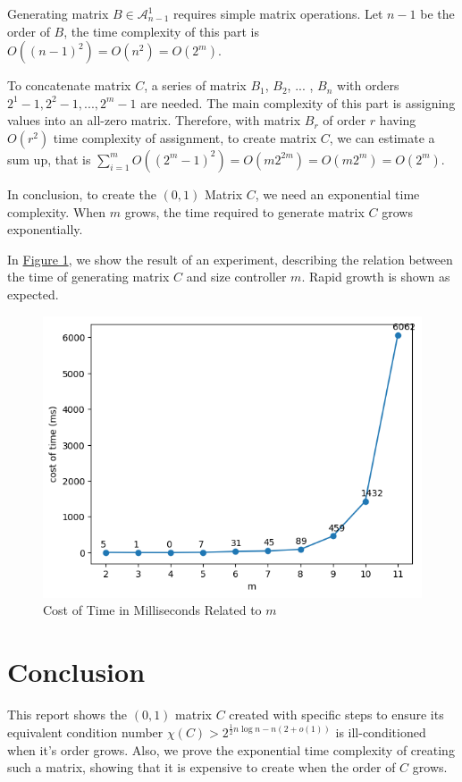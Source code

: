 \documentclass[11pt]{article}
\begin{document}
Generating matrix $B\in \mathcal{A}_{n - 1}^1$ requires simple matrix operations. Let $n - 1$ be the order of $B$, the time complexity of this part is $O((n-1)^2) = O(n^2) = O(2^m)$.

To concatenate matrix $C$, a series of matrix $B_1$, $B_2$, ... , $B_n$ with orders $2^1-1, 2^2-1, ..., 2^m-1$ are needed. The main complexity of this part is assigning values into an all-zero matrix. Therefore, with matrix $B_r$ of order $r$ having $O(r^2)$ time complexity of assignment, to create matrix $C$, we can estimate a sum up, that is $\sum_{i=1}^{m}O((2^m - 1)^2) = O(m2^{2m}) = O(m2^m) = O(2^m)$.

In conclusion, to create the $(0, 1)$ Matrix $C$, we need an exponential time complexity. When $m$ grows, the time required to generate matrix $C$ grows exponentially.

In \hyperref[costoftime]{Figure 1}, we show the result of an experiment, describing the relation between the time of generating matrix $C$ and size controller $m$. Rapid growth is shown as expected.

\begin{figure}[htp]
    \centering
    \includegraphics{fig/output.png}
    \caption{Cost of Time in Milliseconds Related to $m$}\label{costoftime}
\end{figure}

\section{Conclusion}
This report shows the $(0, 1)$ matrix $C$ created with specific steps to ensure its equivalent condition number $\chi(C) > 2^{\frac{1}{2}n\log n-n(2+o(1))}$ is ill-conditioned when it's order grows. Also, we prove the exponential time complexity of creating such a matrix, showing that it is expensive to create when the order of $C$ grows.
\end{document}
